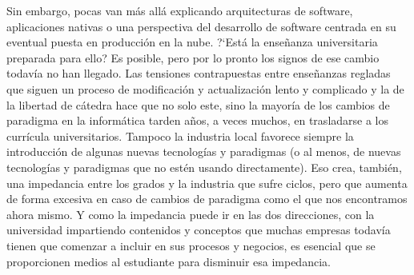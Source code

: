 \documentclass[twoside,10pt]{article}
\begin{document}
\begin{multicols}{2}
Sin embargo, pocas van m\'as all\'a explicando arquitecturas de software,
aplicaciones nativas o una perspectiva del desarrollo de software centrada
en su eventual puesta en producci\'on en la nube. ?`Est\'a la ense\~nanza
universitaria preparada para ello? Es posible, pero
por lo pronto los signos de ese cambio todav\'ia no han llegado. Las
tensiones contrapuestas entre ense\~nanzas regladas que siguen un proceso
de modificaci\'on y actualizaci\'on lento y complicado y la de la libertad
de c\'atedra hace que no solo este, sino la mayor\'ia de los cambios de
paradigma en la inform\'atica tarden a\~nos, a veces muchos, en trasladarse
a los curr\'icula
universitarios. 
Tampoco la industria local favorece siempre la introducción de algunas
nuevas tecnologías y paradigmas (o al menos, de nuevas tecnologías y
paradigmas que no estén usando directamente). Eso crea, tambi\'en, una
impedancia entre los grados y
la industria que sufre ciclos, pero que aumenta de forma excesiva en
caso de cambios de paradigma como el que nos encontramos ahora
mismo. Y como la impedancia puede ir en las dos direcciones, con la
universidad impartiendo contenidos y conceptos que muchas empresas
todavía tienen que comenzar a incluir en sus procesos y negocios, es
esencial que se proporcionen medios al estudiante para disminuir esa
impedancia. 
%


\end{multicols}
\end{document}
